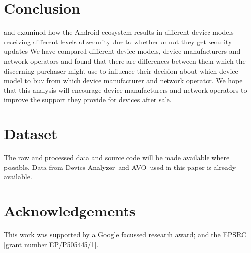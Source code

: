 \documentclass{sig-alternate}
\newcommand{\da}{Device Analyzer}
\newcommand{\avo}{AVO}
\newcommand{\identifying}[1]{#1}%
\begin{document}
\cite{Nappa2015}
\cite{Zhang2014}
\cite{Lindorfer2014}
\cite{Arp2014}

\section{Conclusion}
 and examined how the Android ecosystem results in different device models receiving different levels of security due to whether or not they get security updates
We have compared different device models, device manufacturers and network operators and found that there are differences between them which the discerning purchaser might use to influence their decision about which device model to buy from which device manufacturer and network operator.
We hope that this analysis will encourage device manufacturers and network operators to improve the support they provide for devices after sale.

\section*{Dataset}
The raw and processed data and source code will be made available where possible.
Data from \da\ and \avo\ used in this paper is already available.

\sloppy
\section*{Acknowledgements}
\identifying{
This work was supported by a Google focussed research award; and the EPSRC [grant number EP/P505445/1].
}

\printbibliography
\end{document}
